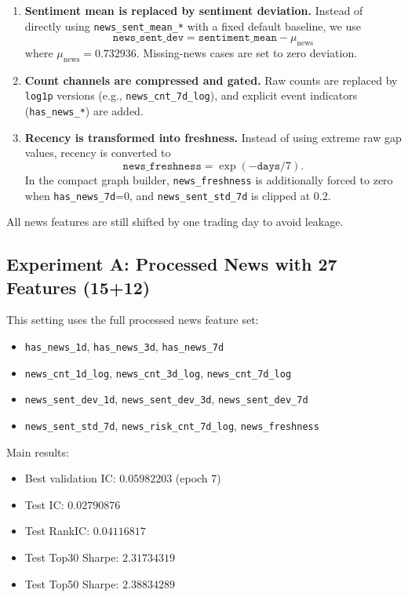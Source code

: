 \begin{enumerate}
\item \textbf{Sentiment mean is replaced by sentiment deviation.}
Instead of directly using \texttt{news\_sent\_mean\_*} with a fixed default baseline, we use
\[
\texttt{news\_sent\_dev} = \texttt{sentiment\_mean} - \mu_{\text{news}}
\]
where $\mu_{\text{news}} = 0.732936$. Missing-news cases are set to zero deviation.

\item \textbf{Count channels are compressed and gated.}
Raw counts are replaced by \texttt{log1p} versions (e.g., \texttt{news\_cnt\_7d\_log}), and explicit event indicators (\texttt{has\_news\_*}) are added.

\item \textbf{Recency is transformed into freshness.}
Instead of using extreme raw gap values, recency is converted to
\[
\texttt{news\_freshness} = \exp(-\texttt{days}/7).
\]
In the compact graph builder, \texttt{news\_freshness} is additionally forced to zero when \texttt{has\_news\_7d}=0, and \texttt{news\_sent\_std\_7d} is clipped at 0.2.
\end{enumerate}

All news features are still shifted by one trading day to avoid leakage.

\subsection{Experiment A: Processed News with 27 Features (15+12)}

This setting uses the full processed news feature set:
\begin{itemize}
\item \texttt{has\_news\_1d}, \texttt{has\_news\_3d}, \texttt{has\_news\_7d}
\item \texttt{news\_cnt\_1d\_log}, \texttt{news\_cnt\_3d\_log}, \texttt{news\_cnt\_7d\_log}
\item \texttt{news\_sent\_dev\_1d}, \texttt{news\_sent\_dev\_3d}, \texttt{news\_sent\_dev\_7d}
\item \texttt{news\_sent\_std\_7d}, \texttt{news\_risk\_cnt\_7d\_log}, \texttt{news\_freshness}
\end{itemize}

Main results:
\begin{itemize}
\item Best validation IC: $0.05982203$ (epoch 7)
\item Test IC: $0.02790876$
\item Test RankIC: $0.04116817$
\item Test Top30 Sharpe: $2.31734319$
\item Test Top50 Sharpe: $2.38834289$
\end{itemize}

